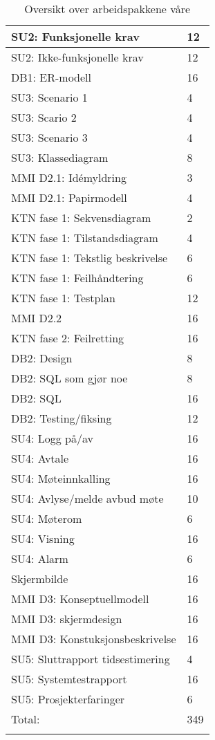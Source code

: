 \begin{center}
\label{tab:arbeidspakker}
\begin{longtable}{| l | l |}
\hline
SU2: Funksjonelle krav & 12 \\
\hline
SU2: Ikke-funksjonelle krav & 12 \\
\hline
DB1: ER-modell & 16 \\
\hline
SU3: Scenario 1 & 4 \\
\hline
SU3: Scario 2 & 4 \\
\hline
SU3: Scenario 3 & 4 \\
\hline
SU3: Klassediagram & 8 \\
\hline
MMI D2.1: Idémyldring & 3 \\
\hline
MMI D2.1: Papirmodell & 4 \\
\hline
KTN fase 1: Sekvensdiagram & 2 \\
\hline
KTN fase 1: Tilstandsdiagram & 4 \\
\hline
KTN fase 1: Tekstlig beskrivelse & 6 \\
\hline
KTN fase 1: Feilhåndtering & 6 \\
\hline
KTN fase 1: Testplan & 12 \\
\hline
MMI D2.2 & 16 \\
\hline
KTN fase 2: Feilretting & 16 \\
\hline
DB2: Design & 8 \\
\hline
DB2: SQL som gjør noe & 8 \\
\hline
DB2: SQL & 16 \\
\hline
DB2: Testing/fiksing & 12 \\
\hline
SU4: Logg på/av & 16\\
\hline
SU4: Avtale & 16\\
\hline
SU4: Møteinnkalling & 16\\
\hline
SU4: Avlyse/melde avbud møte & 10\\
\hline
SU4: Møterom & 6\\
\hline
SU4: Visning & 16\\
\hline
SU4: Alarm & 6\\
\hline
Skjermbilde & 16\\
\hline
MMI D3: Konseptuellmodell & 16\\
\hline
MMI D3: skjermdesign & 16\\
\hline
MMI D3: Konstuksjonsbeskrivelse & 16\\
\hline
SU5: Sluttrapport tidsestimering & 4\\
\hline
SU5: Systemtestrapport & 16\\
\hline
SU5: Prosjekterfaringer & 6\\
\hline
Total: & 349\\
\hline
\caption{Oversikt over arbeidspakkene våre}
\end{longtable}
\end{center}